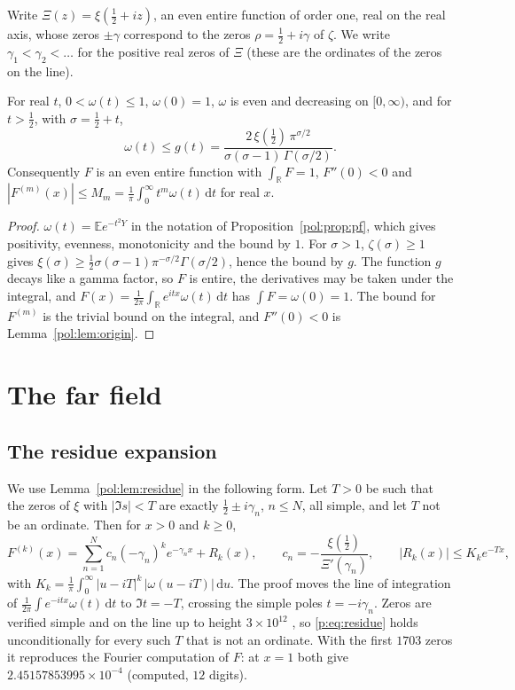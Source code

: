 Write $\Xi(z)=\xi(\frac12+iz)$, an even entire function of order one, real on the real axis, whose zeros $\pm\gamma$ correspond to the zeros $\rho=\frac12+i\gamma$ of $\zeta$. We write $\gamma_1<\gamma_2<\dots$ for the positive real zeros of $\Xi$ (these are the ordinates of the zeros on the line).

\begin{lemma}\label{p:lem:phipath}
For real $t$, $0<\omega(t)\le1$, $\omega(0)=1$, $\omega$ is even and decreasing on $[0,\infty)$, and for $t>\frac12$, with $\sigma=\frac12+t$,
\[
\omega(t)\le g(t)=\frac{2\,\xi(\frac12)\,\pi^{\sigma/2}}{\sigma(\sigma-1)\,\Gamma(\sigma/2)} .
\]
Consequently $F$ is an even entire function with $\int_{\mathbb R}F=1$, $F''(0)<0$ and $|F^{(m)}(x)|\le M_m=\frac1\pi\int_0^\infty t^m\omega(t)\,\mathrm dt$ for real $x$.
\end{lemma}

\begin{proof}
$\omega(t)=\mathbb Ee^{-t^2Y}$ in the notation of Proposition~\ref{pol:prop:pf}, which gives positivity, evenness, monotonicity and the bound by $1$. For $\sigma>1$, $\zeta(\sigma)\ge1$ gives $\xi(\sigma)\ge\frac12\sigma(\sigma-1)\pi^{-\sigma/2}\Gamma(\sigma/2)$, hence the bound by $g$. The function $g$ decays like a gamma factor, so $F$ is entire, the derivatives may be taken under the integral, and $F(x)=\frac1{2\pi}\int_{\mathbb R}e^{itx}\omega(t)\,\mathrm dt$ has $\int F=\omega(0)=1$. The bound for $F^{(m)}$ is the trivial bound on the integral, and $F''(0)<0$ is Lemma~\ref{pol:lem:origin}.
\end{proof}

\section{The far field}\label{p:sec:far}

\subsection{The residue expansion}

We use Lemma~\ref{pol:lem:residue} in the following form. Let $T>0$ be such that the zeros of $\xi$ with $|\Im s|<T$ are exactly $\frac12\pm i\gamma_n$, $n\le N$, all simple, and let $T$ not be an ordinate. Then for $x>0$ and $k\ge0$,
\begin{equation}\label{p:eq:residue}
F^{(k)}(x)=\sum_{n=1}^Nc_n(-\gamma_n)^ke^{-\gamma_nx}+R_k(x),\qquad c_n=-\frac{\xi(\frac12)}{\Xi'(\gamma_n)},\qquad |R_k(x)|\le K_ke^{-Tx},
\end{equation}
with $K_k=\frac1\pi\int_0^\infty|u-iT|^k\,|\omega(u-iT)|\,\mathrm du$. The proof moves the line of integration of $\frac1{2\pi}\int e^{-itx}\omega(t)\,\mathrm dt$ to $\Im t=-T$, crossing the simple poles $t=-i\gamma_n$. Zeros are verified simple and on the line up to height $3\times10^{12}$ \cite{PT21}, so \eqref{p:eq:residue} holds unconditionally for every such $T$ that is not an ordinate. With the first $1703$ zeros it reproduces the Fourier computation of $F$: at $x=1$ both give $2.45157853995\times10^{-4}$ (computed, $12$ digits).

